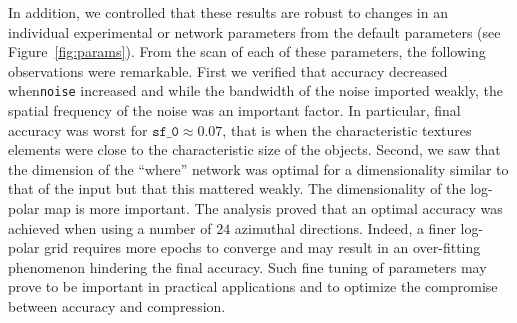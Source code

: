 In addition, we controlled that these results are robust to changes in an individual experimental or network parameters from the default parameters (see Figure~\ref{fig:params}). From the scan of each of these parameters, the following observations were remarkable. First we verified that accuracy decreased when\texttt{noise} increased and while the bandwidth of the noise imported weakly, the spatial frequency of the noise was an important factor. In particular, final accuracy was worst for $\texttt{sf\_0} \approx 0.07$, that is when the characteristic textures elements were close to the characteristic size of the objects. Second, we saw that the dimension of the ``where'' network was optimal for a dimensionality similar to that of the input but that this mattered weakly. The dimensionality of the log-polar map is more important. The analysis proved that an optimal accuracy was achieved when using a number of $24$ azimuthal directions. Indeed, a finer log-polar grid requires more epochs to converge and may result in an over-fitting phenomenon hindering the final accuracy. Such fine tuning of parameters may prove to be important in practical applications and to optimize the compromise between accuracy and compression. 
